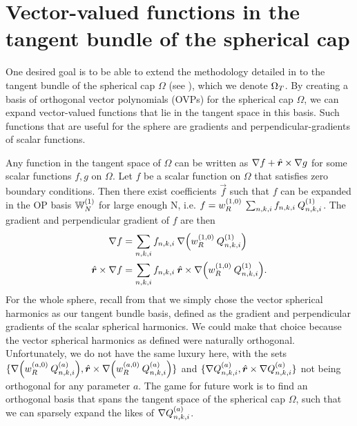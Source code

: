 

\section{Vector-valued functions in the tangent bundle of the spherical cap}\label{appendix:tangent}

One desired goal is to be able to extend the methodology detailed in  to the tangent bundle of the spherical cap $\Omega$ (see ), which we denote ${\Omega_T}$. By creating a basis of orthogonal vector polynomials (OVPs) for the spherical cap $\Omega$, we can expand vector-valued functions that lie in the tangent space in this basis. Such functions that are useful for the sphere are gradients and perpendicular-gradients of scalar functions.

Any function in the tangent space of $\Omega$ can be written as $\nabla f + \hat{\bm{r}} \times \nabla g$ for some scalar functions $f, g$ on $\Omega$. Let $f$ be a scalar function on $\Omega$ that satisfies zero boundary conditions. Then there exist coefficients $\vec{f}$ such that $f$ can be expanded in the OP basis $\mathbb{W}_N^{(1)}$ for large enough N, i.e. $f = w_R^{(1,0)} \: \sum_{n,k,i} f_{n,k,i} \: Q_{n,k,i}^{(1)}$. The gradient and perpendicular gradient of $f$ are then
\begin{align*}
	\nabla f &= \sum_{n,k,i} f_{n,k,i} \: \nabla \Big( w_R^{(1,0)} \: Q_{n,k,i}^{(1)} \Big) \\
	\hat{\bm{r}} \times \nabla f &= \sum_{n,k,i} f_{n,k,i} \: \hat{\bm{r}} \times \nabla \Big( w_R^{(1,0)} \: Q_{n,k,i}^{(1)} \Big).
\end{align*}
For the whole sphere, recall from  that we simply chose the vector spherical harmonics as our tangent bundle basis, defined as the gradient and perpendicular gradients of the scalar spherical harmonics. We could make that choice because the vector spherical harmonics as defined were naturally orthogonal. Unfortunately, we do not have the same luxury here, with the sets $\{ \nabla \Big( w_R^{(a,0)} \: Q_{n,k,i}^{(a)} \Big), \hat{\bm{r}} \times \nabla \Big( w_R^{(a,0)} \: Q_{n,k,i}^{(a)} \Big) \}$ and $\{ \nabla Q_{n,k,i}^{(a)}, \hat{\bm{r}} \times \nabla Q_{n,k,i}^{(a)} \}$ not being orthogonal for any parameter $a$. The game for future work is to find an orthogonal basis that spans the tangent space of the spherical cap $\Omega$, such that we can sparsely expand the likes of $\nabla Q_{n,k,i}^{(a)}$.




